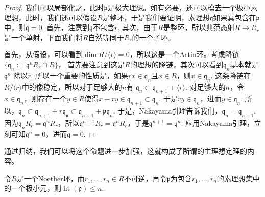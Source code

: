 \begin{proof}
我们可以局部化之，此时$\mathfrak p$是极大理想。如有必要，还可以模去一个极小素理想，此时，我们还可以假设$R$是整环，于是我们要证明，素理想$\mathfrak q$如果真包含在$\mathfrak p$中，则$\mathfrak q = 0$. 首先，注意到$\mathfrak q$不包含$r$. 
其次，由于$R$是整环，所以典范态射$R\to R_r$是一个单射，下面我们将$R$自然等同于$R_r$的一个子环。

首先，从假设，可以看到$\dim R/\langle r\rangle=0$，所以这是一个Artin环。考虑降链$\{\mathfrak q_n:=\mathfrak q^n R_r\cap R\}$，
首先要注意到这是$R$的理想的降链，其次可以看到$\mathfrak q_n$基本就是$\mathfrak q^n$
除以$r$. 所以一个重要的性质是，如果$rx\in \mathfrak q_n$且$x\in R$，则$x\in \mathfrak q_n$.
这条降链在$R/\langle r\rangle$中的像稳定，所以对于足够大的$n$有
$\mathfrak q_n\subset \mathfrak q_{n+1}+\langle r\rangle$. 
对足够大的$n$，令$x\in \mathfrak q_n$，则存在一个$y\in R$使得$x-ry\in \mathfrak q_{n+1}\subset \mathfrak q_n$. 于是$ry\in \mathfrak q_n$，进而$y \in \mathfrak q_n$.
所以，$\mathfrak q_n\subset \mathfrak q_{n+1}+r\mathfrak{q_n}\subset \mathfrak q_{n+1}+\mathfrak p \mathfrak q_n$. 于是，Nakayama引理告诉我们，$\mathfrak q_n=\mathfrak q_{n+1}$. 
因为$\mathfrak q_n R_{r}=\mathfrak q^n R_{r}$，所以$\mathfrak q^{n+1}R_r=\mathfrak q^{n}R_r$，于是$\mathfrak q^{n+1}=\mathfrak q^n$. 应用Nakayama引理，立刻可知$\mathfrak q^n=0$，进而$\mathfrak q=0$.
\end{proof}

通过归纳，我们可以将这个命题进一步加强，这就构成了所谓的主理想定理的内容。

\begin{thm}[Krull主理想定理]
令$R$是一个Noether环，而$r_1,\dots,r_n\in R$不可逆，再令$\mathfrak p$为包含$r_1,\dots,r_n$的素理想集中的一个极小元，则$\operatorname{ht}(\mathfrak p)\leq n$.
\end{thm}

